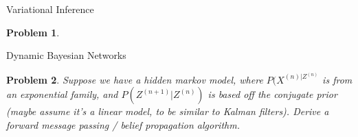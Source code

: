 \documentclass[a4paper]{article}
\newtheorem{problem}{Problem}[section]
\begin{document}
Variational Inference
\begin{problem}

\end{problem}

Dynamic Bayesian Networks

\begin{problem}
  Suppose we have a hidden markov model, where $P(X^{(n) \vert Z^{(n)}}$ is from an exponential family, and $P( Z^{(n+1)} \vert Z^{(n)} )$ is based off the conjugate prior (maybe assume it's a linear model, to be similar to Kalman filters).  Derive a forward message passing / belief propagation algorithm.
\end{problem}
\end{document}
